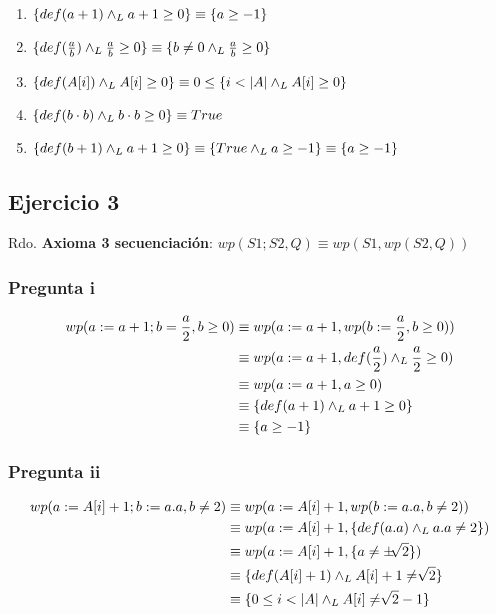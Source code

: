 \begin{enumerate}
    \item $ \{ def(a+1) \land _L a+1 \geq 0 \} \equiv \{ a \geq -1\} $
    \item $ \{ def(\frac{a}{b}) \land _L \frac{a}{b} \geq 0 \} \equiv \{ b \neq 0 \land _L \frac{a}{b} \geq 0 \} $
    \item $ \{ def(A[i]) \land _L A[i] \geq 0 \} \equiv 0 \leq \{ i < |A| \land _L A[i] \geq 0 \} $
    \item $ \{ def(b \cdot b) \land _L b \cdot b \geq 0 \} \equiv True $
    \item $ \{ def(b+1) \land _L a+1 \geq 0 \} \equiv \{ True \land _L a \geq -1 \} \equiv \{ a \geq -1 \} $
\end{enumerate}

\subsection{Ejercicio 3}

Rdo. \textbf{Axioma 3 secuenciación}: $ wp(S1; S2, Q) \equiv wp(S1, wp(S2, Q)) $

\subsubsection{Pregunta i}
\begin{align*}
    wp(a := a+1; b = \frac{a}{2}, b \geq 0) &\equiv wp(a := a+1, wp(b:= \frac{a}{2}, b \geq 0)) \\ 
    &\equiv wp(a := a+1, def(\frac{a}{2}) \yLuego \frac{a}{2} \geq 0) \\ 
    &\equiv wp(a := a+1, a \geq 0) \\ 
    &\equiv \{ def(a+1) \yLuego a+1 \geq 0 \} \\ 
    &\equiv \{ a \geq -1 \} \\ 
\end{align*}

\subsubsection{Pregunta ii}
\begin{align*}
    wp(a := A[i] + 1; b := a.a, b \neq 2) &\equiv wp(a := A[i] + 1, wp(b := a.a, b \neq 2)) \\
    &\equiv wp(a := A[i] + 1, \{ def(a.a) \land _L a.a \neq 2 \}) \\
    &\equiv wp(a := A[i] + 1, \{ a \neq \pm \sqrt[]{2} \}) \\
    &\equiv \{ def(A[i] + 1) \land _L A[i] + 1 \neq \sqrt[]{2} \} \\
    &\equiv \{ 0 \leq i < |A| \land _L A[i] \neq \sqrt[]{2} - 1 \} \\
\end{align*}

